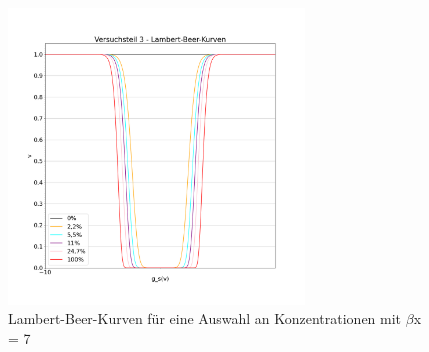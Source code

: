 \documentclass{article}
\begin{document}
            \begin{figure}[H]
                \centering
                \includegraphics[width=0.7\textwidth]{Daten/LambertBeer.png}
                \caption{Lambert-Beer-Kurven für eine Auswahl an Konzentrationen mit $\beta$x = 7}
            \end{figure}
\end{document}
